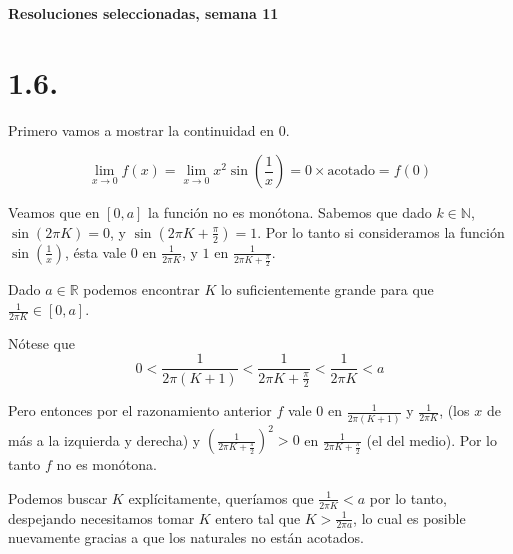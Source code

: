 \documentclass[10pt,a4paper]{article}
\begin{document}
\vspace{0,3cm}

\begin{center}
{\bf \Large Resoluciones seleccionadas, semana 11}
\end{center}


\vspace{0,3cm}

\section*{1.6.}\emph{}

\noindent
Primero vamos a mostrar la continuidad en $0$.


$$
\displaystyle{\lim_{x\rightarrow 0} f(x)
  = \lim_{x\rightarrow 0} x^2 \sin \left(\frac{1}{x}\right)= 0\times
  \text{acotado} = f(0)}
$$


\noindent

Veamos que en $[0,a]$ la funci\'on no es mon\'otona.
Sabemos que dado $k \in \mathbb{N}$, $\sin(2\pi K)=0$, y
$\sin(2 \pi K + \frac{\pi}{2}) = 1$.
Por lo tanto si consideramos la funci\'on $\sin(\frac{1}{x})$, \'esta vale
$0$ en
$\displaystyle{\frac{1}{2\pi K}}$, y  $1$ en
$\displaystyle{\frac{1}{2 \pi K + \frac{\pi}{2}}}$.

\noindent
Dado $a \in \mathbb{R}$ podemos encontrar $K$ lo suficientemente grande
para que $\displaystyle{\frac{1}{2\pi K} \in [0,a]}$.

\noindent
N\'otese que
$$0 < \frac{1}{2\pi (K+1)} <
\frac{1}{2 \pi K + \frac{\pi}{2}} < \frac{1}{2\pi K} < a$$

\noindent
Pero entonces por el razonamiento anterior
$f$ vale 0 en $\displaystyle{\frac{1}{2\pi (K+1)}}$ y
$\displaystyle{\frac{1}{2\pi K}}$,
(los $x$ de m\'as a la izquierda y derecha) y
$\displaystyle{\left( \frac{1}{2 \pi K + \frac{\pi}{2}}\right)^2 > 0}$ en
$\displaystyle{\frac{1}{2 \pi K + \frac{\pi}{2}}}$ (el del medio).
Por lo tanto $f$ no es mon\'otona.

\noindent
Podemos buscar $K$ expl\'icitamente, quer\'iamos que
$ \displaystyle{\frac{1}{2\pi K}< a}$
por lo tanto, despejando necesitamos tomar $K$ entero tal que
$\displaystyle{ K >  \frac{1}{2\pi a}}$,
lo cual es posible nuevamente gracias a que los naturales no est\'an acotados.
\end{document}
